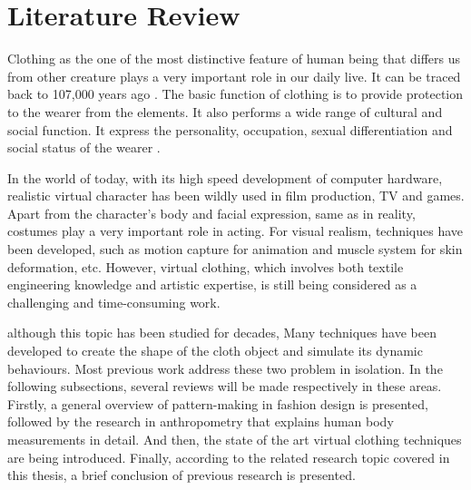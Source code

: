 
\ifx\isEmbedded\undefined

\graphicspath{{../images/}}

\fi


\chapter{Literature Review}
\label{cha:literature_review}

Clothing as the one of the most distinctive feature of human being that differs us from other creature plays a very important role in our daily live. It can be traced back to 107,000 years ago \cite{Kittler2003} \cite{Toups2011}. The basic function of clothing is to provide protection to the wearer from the elements. It also performs a wide range of cultural and social function. It express the personality, occupation, sexual differentiation and social status of the wearer \cite{Harms1938}.

In the world of today, with its high speed development of computer hardware, realistic virtual character has been wildly used in film production, TV and games. Apart from the character's body and facial expression, same as in reality, costumes play a very important role in acting. For visual realism, techniques have been developed, such as motion capture for animation and muscle system for skin deformation, etc. However, virtual clothing, which involves both textile engineering knowledge and artistic expertise, is still being considered as a challenging and time-consuming work. 

although this topic has been studied for decades, Many techniques have been developed to create the shape of the cloth object and simulate its dynamic behaviours. Most previous work address these two problem in isolation. In the following subsections, several reviews will be made respectively in these areas. Firstly, a general overview of pattern-making in fashion design is presented, followed by the research in anthropometry that explains human body measurements in detail. And then, the state of the art virtual clothing techniques are being introduced. Finally, according to the related research topic covered in this thesis, a brief conclusion of previous research is presented. 


